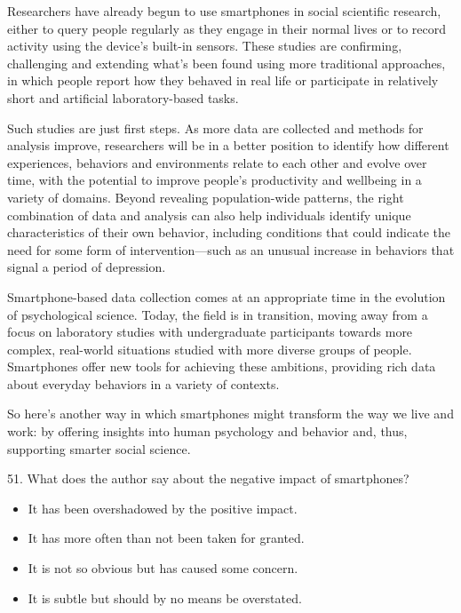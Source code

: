 \documentclass[UTF8,11pt]{ctexart}
\begin{document}
Researchers have already begun to use smartphones in social scientific research, either to query people regularly as they engage in their normal lives or to record activity using the device’s built-in sensors. These studies are confirming, challenging and extending what’s been found using more traditional approaches, in which people report how they behaved in real life or participate in relatively short and artificial laboratory-based tasks.


Such studies are just first steps. As more data are collected and methods for analysis improve, researchers will be in a better position to identify how different experiences, behaviors and environments relate to each other and evolve over time, with the potential to improve people’s productivity and wellbeing in a variety of domains. Beyond revealing population-wide patterns, the right combination of data and analysis can also help individuals identify unique characteristics of their own behavior, including conditions that could indicate the need for some form of intervention—such as an unusual increase in behaviors that signal a period of depression.


Smartphone-based data collection comes at an appropriate time in the evolution of psychological science. Today, the field is in transition, moving away from a focus on laboratory studies with undergraduate participants towards more complex, real-world situations studied with more diverse groups of people. Smartphones offer new tools for achieving these ambitions, providing rich data about everyday behaviors in a variety of contexts.


So here’s another way in which smartphones might transform the way we live and work: by offering insights into human psychology and behavior and, thus, supporting smarter social science.


51. What does the author say about the negative impact of smartphones?


\begin{itemize}[leftmargin=2em,itemsep=.2em,topsep=.4em]\item[A.] It has been overshadowed by the positive impact.
\item[B.] It has more often than not been taken for granted.
\item[C.] It is not so obvious but has caused some concern.
\item[D.] It is subtle but should by no means be overstated.
\end{itemize}
\end{document}
